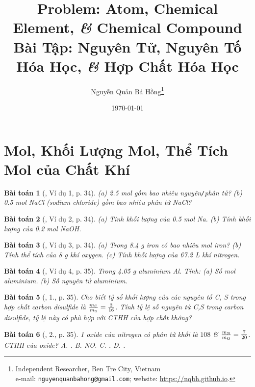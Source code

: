\documentclass{article}
\title{Problem: Atom, Chemical Element, \textit{\&} Chemical Compound\\Bài Tập: Nguyên Tử, Nguyên Tố Hóa Học, \textit{\&} Hợp Chất Hóa Học}
\author{Nguyễn Quản Bá Hồng\footnote{Independent Researcher, Ben Tre City, Vietnam\\e-mail: \texttt{nguyenquanbahong@gmail.com}; website: \url{https://nqbh.github.io}.}}
\date{\today}
\newtheorem{baitoan}{Bài toán}
\begin{document}
\maketitle


\section{Mol, Khối Lượng Mol, Thể Tích Mol của Chất Khí}

\begin{baitoan}[\cite{An_Hoa_Hoc_nang_cao_8_9}, Ví dụ 1, p. 34]
	(a) {2.5 mol} gồm bao nhiêu nguyên{\tt/}phân tử?  (b) {\rm 0.5 mol NaCl} (sodium chloride) gồm bao nhiêu phân tử {\rm NaCl}? 
\end{baitoan}

\begin{baitoan}[\cite{An_Hoa_Hoc_nang_cao_8_9}, Ví dụ 2, p. 34]
	(a) Tính khối lượng của {\rm0.5 mol Na}. (b) Tính khối lượng của {\rm0.2 mol NaOH}.
\end{baitoan}

\begin{baitoan}[\cite{An_Hoa_Hoc_nang_cao_8_9}, Ví dụ 3, p. 34]
	(a) Trong {\rm8.4 g} iron có bao nhiêu mol iron? (b) Tính thể tích của {\rm8 g} khí oxygen. (c) Tính khối lượng của {\rm67.2 L} khí nitrogen.
\end{baitoan}

\begin{baitoan}[\cite{An_Hoa_Hoc_nang_cao_8_9}, Ví dụ 4, p. 35]
	Trong {\rm4.05 g} aluminium {\rm Al}. Tính: (a) Số mol aluminium. (b) Số nguyên tử aluminium.
\end{baitoan}

\begin{baitoan}[\cite{An_Hoa_Hoc_nang_cao_8_9}, 1., p. 35]
	Cho biết tỷ số khối lượng của các nguyên tố {\rm C, S} trong hợp chất carbon disulfide là $\frac{m_{\rm C}}{m_{\rm S}} = \frac{3}{16}$. Tính tỷ lệ số nguyên tử {\rm C,S} trong carbon disulfide, tỷ lệ này có phù hợp với {\rm CTHH} của hợp chất {\rm{}} không?
\end{baitoan}

\begin{baitoan}[\cite{An_Hoa_Hoc_nang_cao_8_9}, 2., p. 35]
	1 oxide của nitrogen có phân tử khối là $108$ \& $\frac{m_{\rm N}}{m_{\rm O}} = \frac{7}{20}$. {\rm CTHH} của oxide? {\sf A.} {\rm{}}. {\sf B.} {\rm NO}. {\rm C.} {\rm{}}. {\sf D.} {\rm{}}.
\end{baitoan}
\end{document}
